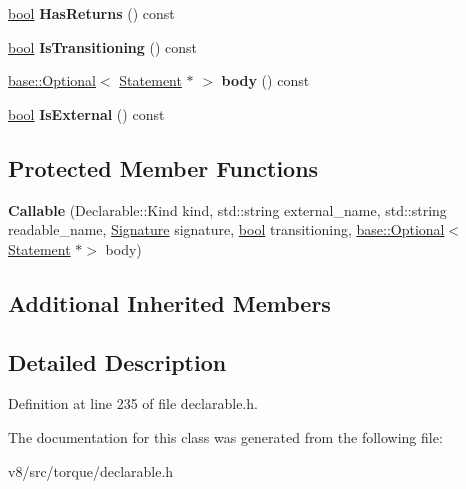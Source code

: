 \begin{DoxyCompactItemize}
\mbox{\hyperlink{classbool}{bool}} {\bfseries Has\+Returns} () const
\item 
\mbox{\label{classv8_1_1internal_1_1torque_1_1Callable_ad01de7521cd1ffb2bc2d4261a43892d1}} 
\mbox{\hyperlink{classbool}{bool}} {\bfseries Is\+Transitioning} () const
\item 
\mbox{\label{classv8_1_1internal_1_1torque_1_1Callable_a1aa7518caf9e0d3191fb8239ef8e80ae}} 
\mbox{\hyperlink{classv8_1_1base_1_1Optional}{base\+::\+Optional}}$<$ \mbox{\hyperlink{structv8_1_1internal_1_1torque_1_1Statement}{Statement}} $\ast$ $>$ {\bfseries body} () const
\item 
\mbox{\label{classv8_1_1internal_1_1torque_1_1Callable_a629a2629030419b5fb479d57ae7ca0c4}} 
\mbox{\hyperlink{classbool}{bool}} {\bfseries Is\+External} () const
\end{DoxyCompactItemize}
\subsection*{Protected Member Functions}
\begin{DoxyCompactItemize}
\item 
\mbox{\label{classv8_1_1internal_1_1torque_1_1Callable_ac1612229d9ec3cc6fa9095f26bc0eb6b}} 
{\bfseries Callable} (Declarable\+::\+Kind kind, std\+::string external\+\_\+name, std\+::string readable\+\_\+name, \mbox{\hyperlink{structv8_1_1internal_1_1torque_1_1Signature}{Signature}} signature, \mbox{\hyperlink{classbool}{bool}} transitioning, \mbox{\hyperlink{classv8_1_1base_1_1Optional}{base\+::\+Optional}}$<$ \mbox{\hyperlink{structv8_1_1internal_1_1torque_1_1Statement}{Statement}} $\ast$$>$ body)
\end{DoxyCompactItemize}
\subsection*{Additional Inherited Members}


\subsection{Detailed Description}


Definition at line 235 of file declarable.\+h.



The documentation for this class was generated from the following file\+:\begin{DoxyCompactItemize}
\item 
v8/src/torque/declarable.\+h\end{DoxyCompactItemize}
